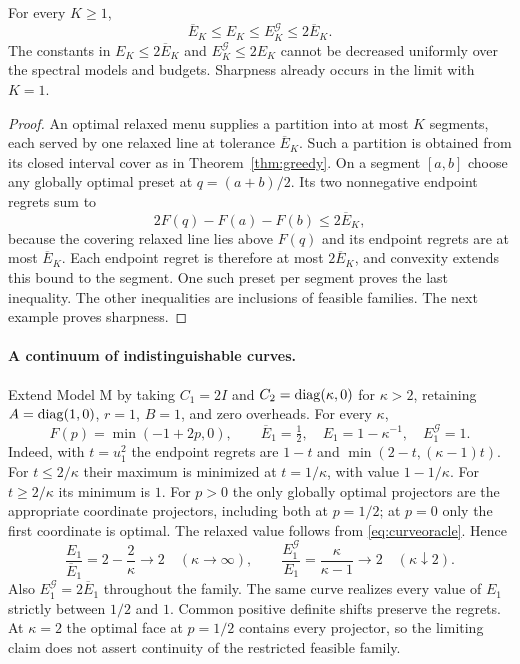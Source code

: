 \begin{theorem}\label{thm:factor}
For every $K\ge1$,
\begin{equation}\label{eq:factor}
 \overline E_K\le E_K\le E_K^{\mathcal G}\le2\overline E_K.
\end{equation}
The constants in $E_K\le2\overline E_K$ and
$E_K^{\mathcal G}\le2E_K$ cannot be decreased uniformly over the spectral
models and budgets. Sharpness already occurs in the limit with $K=1$.
\end{theorem}
\begin{proof}
An optimal relaxed menu supplies a partition into at most $K$ segments,
each served by one relaxed line at tolerance $\overline E_K$. Such a
partition is obtained from its closed interval cover as in
Theorem~\ref{thm:greedy}. On a segment $[a,b]$ choose any globally
optimal preset at $q=(a+b)/2$. Its two nonnegative endpoint regrets sum to
\[
 2F(q)-F(a)-F(b)\le2\overline E_K,
\]
because the covering relaxed line lies above $F(q)$ and its endpoint
regrets are at most $\overline E_K$. Each endpoint regret is therefore
at most $2\overline E_K$, and convexity extends this bound to the segment.
One such preset per segment proves the last inequality. The other
inequalities are inclusions of feasible families. The next example proves
sharpness.
\end{proof}

\paragraph{A continuum of indistinguishable curves.}
Extend Model M by taking $C_1=2I$ and $C_2=\operatorname{diag}(\kappa,0)$ for
$\kappa>2$, retaining $A=\operatorname{diag}(1,0)$, $r=1$, $B=1$, and zero overheads.
For every $\kappa$,
\begin{equation}\label{eq:kappa}
 F(p)=\min(-1+2p,0),\qquad
 \overline E_1=\tfrac12,\quad
 E_1=1-\kappa^{-1},\quad E_1^{\mathcal G}=1.
\end{equation}
Indeed, with $t=u_1^2$ the endpoint regrets are $1-t$ and
$\min(2-t,(\kappa-1)t)$. For $t\le2/\kappa$ their maximum is minimized
at $t=1/\kappa$, with value $1-1/\kappa$. For $t\ge2/\kappa$ its
minimum is $1$. For $p>0$ the only globally optimal projectors are the
appropriate coordinate projectors, including both at $p=1/2$; at $p=0$
only the first coordinate is optimal. The relaxed value follows from
\eqref{eq:curveoracle}. Hence
\[
 \frac{E_1}{\overline E_1}=2-\frac2\kappa\longrightarrow2
 \quad(\kappa\to\infty),\qquad
 \frac{E_1^{\mathcal G}}{E_1}=\frac{\kappa}{\kappa-1}
 \longrightarrow2\quad(\kappa\downarrow2).
\]
Also $E_1^{\mathcal G}=2\overline E_1$ throughout the family. The same
curve realizes every value of $E_1$ strictly between $1/2$ and $1$.
Common positive definite shifts preserve the regrets. At $\kappa=2$
the optimal face at $p=1/2$ contains every projector, so the limiting
claim does not assert continuity of the restricted feasible family.

